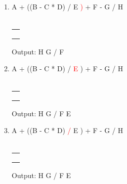 \documentclass[a4paper]{article}
\begin{document}
\begin{large}
\begin{enumerate}
          \renewcommand{\arraystretch}{1.3} \item
          A + ((B - C * D) / E \textcolor{red}{)} + F - G / H\\\\
          \begin{tabular}[t]{ | p{1em} | }
            \\ \hline \\ \hline
            \makecell{)} \\ \hline
            \makecell{+} \\\hline
            \makecell{-} \\\hline
          \end{tabular}
          \hspace{2em}
          Output: H G / F

          \renewcommand{\arraystretch}{1.3} \item
          A + ((B - C * D) /  \textcolor{red}{E} ) + F - G / H\\\\
          \begin{tabular}[t]{ | p{1em} | }
            \\ \hline \\ \hline
            \makecell{)} \\ \hline
            \makecell{+} \\\hline
            \makecell{-} \\\hline
          \end{tabular}
          \hspace{2em}
          Output: H G / F E

          \renewcommand{\arraystretch}{1.3} \item
          A + ((B - C * D) \textcolor{red}{/} E ) + F - G / H\\\\
          \begin{tabular}[t]{ | p{1em} | }
            \\ \hline
            \makecell{/} \\ \hline
            \makecell{)} \\ \hline
            \makecell{+} \\\hline
            \makecell{-} \\\hline
          \end{tabular}
          \hspace{2em}
          Output: H G / F E


\end{enumerate}
\end{large}
\end{document}
